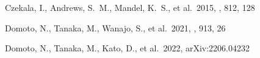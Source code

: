 \documentclass[twocolumn, twocolappendix]{aastex63}
\begin{document}
\begin{itemize}
\begin{thebibliography}{}






 Czekala, I., Andrews, S.~M., Mandel, K.~S., et al.\ 2015, \apj, 812, 128








 Domoto, N., Tanaka, M., Wanajo, S., et al.\ 2021, \apj, 913, 26


 Domoto, N., Tanaka, M., Kato, D., et al.\ 2022, arXiv:2206.04232















\end{thebibliography}
\end{itemize}
\end{document}
